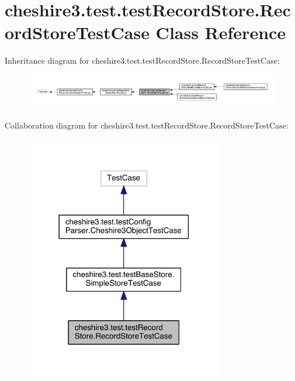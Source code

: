 \hypertarget{classcheshire3_1_1test_1_1test_record_store_1_1_record_store_test_case}{\section{cheshire3.\-test.\-test\-Record\-Store.\-Record\-Store\-Test\-Case Class Reference}
\label{classcheshire3_1_1test_1_1test_record_store_1_1_record_store_test_case}
}


Inheritance diagram for cheshire3.\-test.\-test\-Record\-Store.\-Record\-Store\-Test\-Case\-:
\nopagebreak
\begin{figure}[H]
\begin{center}
\leavevmode
\includegraphics[width=350pt]{classcheshire3_1_1test_1_1test_record_store_1_1_record_store_test_case__inherit__graph}
\end{center}
\end{figure}


Collaboration diagram for cheshire3.\-test.\-test\-Record\-Store.\-Record\-Store\-Test\-Case\-:
\nopagebreak
\begin{figure}[H]
\begin{center}
\leavevmode
\includegraphics[width=246pt]{classcheshire3_1_1test_1_1test_record_store_1_1_record_store_test_case__coll__graph}
\end{center}
\end{figure}
